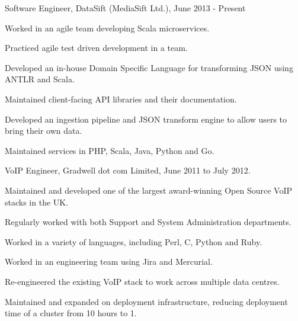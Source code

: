 \documentclass[a4paper]{article}
\renewenvironment{itemize}{
  \begin{list}{}{
    \setlength{\leftmargin}{1.5em}
  }
}{
  \end{list}
}
\newenvironment{packed}{
\begin{itemize}
  \setlength{\itemsep}{0pt}
  \setlength{\parskip}{0pt}
  \setlength{\parsep}{0pt}
}{\end{itemize}}
\begin{document}
\begin{itemize}
\item Software Engineer, DataSift (MediaSift Ltd.), June 2013 - Present
        \begin{packed}
            \item Worked in an agile team developing Scala microservices.
            \item Practiced agile test driven development in a team.
            \item Developed an in-house Domain Specific Language for transforming JSON using ANTLR and Scala.
            \item Maintained client-facing API libraries and their documentation.
            \item Developed an ingestion pipeline and JSON transform engine to allow users to bring their own data.
            \item Maintained services in PHP, Scala, Java, Python and Go.
        \end{packed}
\end{itemize}

\begin{itemize}
\item VoIP Engineer, Gradwell dot com Limited, June 2011 to July 2012.
        \begin{packed}
            \item Maintained and developed one of the largest award-winning Open Source VoIP stacks in the UK.
            \item Regularly worked with both Support and System Administration departments.
            \item Worked in a variety of languages, including Perl, C, Python and Ruby.
            \item Worked in an engineering team using Jira and Mercurial.
            \item Re-engineered the existing VoIP stack to work across multiple data centres.
            \item Maintained and expanded on deployment infrastructure, reducing deployment time of a cluster from 10 hours to 1.
        \end{packed}
\end{itemize}
\end{document}
